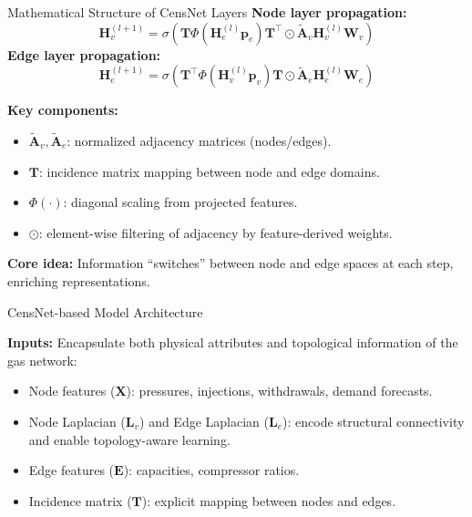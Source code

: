 \documentclass[hyperref={colorlinks,citecolor=blue,linkcolor=blue,urlcolor=blue}]{beamer}
\begin{document}
\begin{frame}{Mathematical Structure of CensNet Layers}
\footnotesize
\textbf{Node layer propagation:}
\[
\mathbf{H}^{(l+1)}_v = \sigma\left(
\mathbf{T} \Phi(\mathbf{H}^{(l)}_e \mathbf{p}_e) \mathbf{T}^\top 
\odot \tilde{\mathbf{A}}_v \mathbf{H}^{(l)}_v \mathbf{W}_v
\right)
\]
\textbf{Edge layer propagation:}
\[
\mathbf{H}^{(l+1)}_e = \sigma\left(
\mathbf{T}^\top \Phi(\mathbf{H}^{(l)}_v \mathbf{p}_v) \mathbf{T} 
\odot \tilde{\mathbf{A}}_e \mathbf{H}^{(l)}_e \mathbf{W}_e
\right)
\]

\medskip
\textbf{Key components:}
\begin{itemize}
    \item \( \tilde{\mathbf{A}}_v, \tilde{\mathbf{A}}_e \): normalized adjacency matrices (nodes/edges).
    \item \( \mathbf{T} \): incidence matrix mapping between node and edge domains.
    \item \( \Phi(\cdot) \): diagonal scaling from projected features.
    \item \( \odot \): element-wise filtering of adjacency by feature-derived weights.
\end{itemize}

\medskip
\textbf{Core idea:} Information “switches” between node and edge spaces at each step, enriching representations.
\end{frame}

\begin{frame}{CensNet-based Model Architecture}
\footnotesize
\justifying
    \centering
    \resizebox{0.9\textwidth}{!}{%
    } 

\textbf{Inputs:} Encapsulate both physical attributes and topological information of the gas network:
        \begin{itemize}
            \item \footnotesize Node features ($\mathbf{X}$): pressures, injections, withdrawals, demand forecasts.
            \item \footnotesize Node Laplacian ($\mathbf{L}_v$) and Edge Laplacian ($\mathbf{L}_e$): encode structural connectivity and enable topology-aware learning.
            \item \footnotesize Edge features ($\mathbf{E}$): capacities, compressor ratios.
            \item \footnotesize Incidence matrix ($\mathbf{T}$): explicit mapping between nodes and edges.
        \end{itemize} 
\end{frame}
\end{document}
